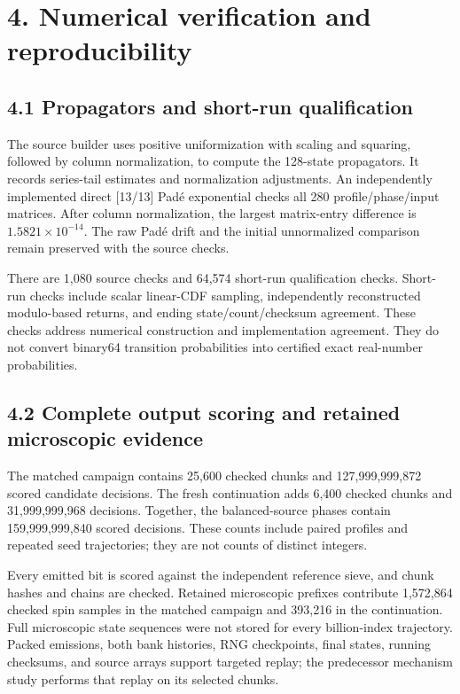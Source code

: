 \documentclass[
  11pt,
]{article}
\begin{document}
\section{4. Numerical verification and
reproducibility}\label{numerical-verification-and-reproducibility}

\subsection{4.1 Propagators and short-run
qualification}\label{propagators-and-short-run-qualification}

The source builder uses positive uniformization with scaling and
squaring, followed by column normalization, to compute the 128-state
propagators. It records series-tail estimates and normalization
adjustments. An independently implemented direct {[}13/13{]} Padé
exponential checks all 280 profile/phase/input matrices. After column
normalization, the largest matrix-entry difference is
\(1.5821\times10^{-14}\). The raw Padé drift and the initial
unnormalized comparison remain preserved with the source checks.

There are 1,080 source checks and 64,574 short-run qualification checks.
Short-run checks include scalar linear-CDF sampling, independently
reconstructed modulo-based returns, and ending state/count/checksum
agreement. These checks address numerical construction and
implementation agreement. They do not convert binary64 transition
probabilities into certified exact real-number probabilities.

\subsection{4.2 Complete output scoring and retained microscopic
evidence}\label{complete-output-scoring-and-retained-microscopic-evidence}

The matched campaign contains 25,600 checked chunks and 127,999,999,872
scored candidate decisions. The fresh continuation adds 6,400 checked
chunks and 31,999,999,968 decisions. Together, the balanced-source
phases contain 159,999,999,840 scored decisions. These counts include
paired profiles and repeated seed trajectories; they are not counts of
distinct integers.

Every emitted bit is scored against the independent reference sieve, and
chunk hashes and chains are checked. Retained microscopic prefixes
contribute 1,572,864 checked spin samples in the matched campaign and
393,216 in the continuation. Full microscopic state sequences were not
stored for every billion-index trajectory. Packed emissions, both bank
histories, RNG checkpoints, final states, running checksums, and source
arrays support targeted replay; the predecessor mechanism study performs
that replay on its selected chunks.
\end{document}

